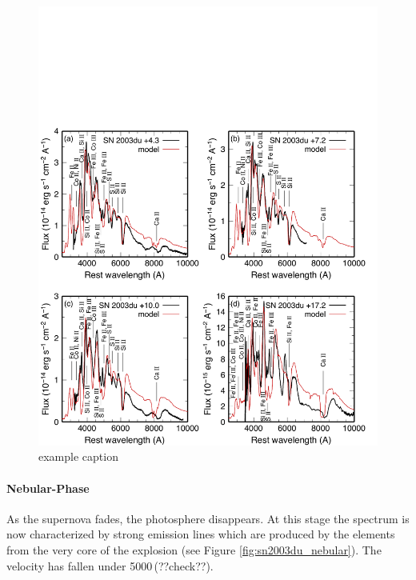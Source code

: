 \begin{figure}[htbp] %
   \centering
   \includegraphics[width=\textwidth]{chapter1/plots/sn2003du_t+17.pdf} 
   \caption{example caption}
   \label{fig:sn2003du_t+17}
\end{figure}


\paragraph{Nebular-Phase}
As the supernova fades, the photosphere disappears. At this stage the spectrum is now characterized by strong emission lines which are produced by the elements from the very core of the explosion (see Figure \ref{fig:sn2003du_nebular}). The velocity has fallen under 5000\,\kms (??check??). 

